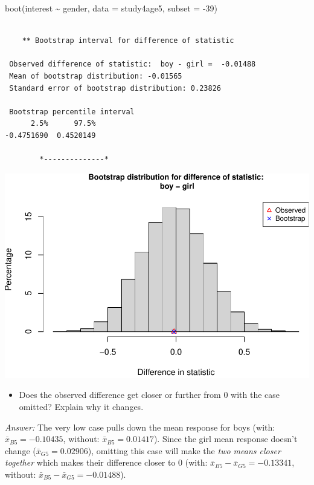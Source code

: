 \documentclass[
]{book}
\newenvironment{Shaded}{\begin{snugshade}}{\end{snugshade}}
\newcommand{\AttributeTok}[1]{\textcolor[rgb]{0.77,0.63,0.00}{#1}}
\newcommand{\DecValTok}[1]{\textcolor[rgb]{0.00,0.00,0.81}{#1}}
\newcommand{\FunctionTok}[1]{\textcolor[rgb]{0.00,0.00,0.00}{#1}}
\newcommand{\NormalTok}[1]{#1}
\newcommand{\SpecialCharTok}[1]{\textcolor[rgb]{0.00,0.00,0.00}{#1}}
\providecommand{\tightlist}{%
  \setlength{\itemsep}{0pt}\setlength{\parskip}{0pt}}
\begin{document}
\begin{Shaded}
\begin{Highlighting}[]
\FunctionTok{boot}\NormalTok{(interest }\SpecialCharTok{\textasciitilde{}}\NormalTok{ gender, }\AttributeTok{data =}\NormalTok{ study4age5, }\AttributeTok{subset =} \SpecialCharTok{{-}}\DecValTok{39}\NormalTok{)}
\end{Highlighting}
\end{Shaded}

\begin{verbatim}

    ** Bootstrap interval for difference of statistic

 Observed difference of statistic:  boy - girl =  -0.01488 
 Mean of bootstrap distribution: -0.01565 
 Standard error of bootstrap distribution: 0.23826 

 Bootstrap percentile interval
      2.5%      97.5% 
-0.4751690  0.4520149 

        *--------------*
\end{verbatim}

\includegraphics[width=1\linewidth]{Class_Activity_14_files/figure-latex/unnamed-chunk-13-2}

\begin{itemize}
\tightlist
\item
  Does the observed difference get closer or further from 0 with the case omitted? Explain why it changes.
\end{itemize}

\emph{Answer:} The very low case pulls down the mean response for boys (with: \(\bar{x}_{B5} = -0.10435\), without: \(\bar{x}_{B5} = 0.01417\)). Since the girl mean response doesn't change (\(\bar{x}_{G5} = 0.02906\)), omitting this case will make the \emph{two means closer together} which makes their difference closer to 0 (with: \(\bar{x}_{B5} - \bar{x}_{G5} = -0.13341\), without: \(\bar{x}_{B5} - \bar{x}_{G5} = -0.01488\)).
\end{document}
